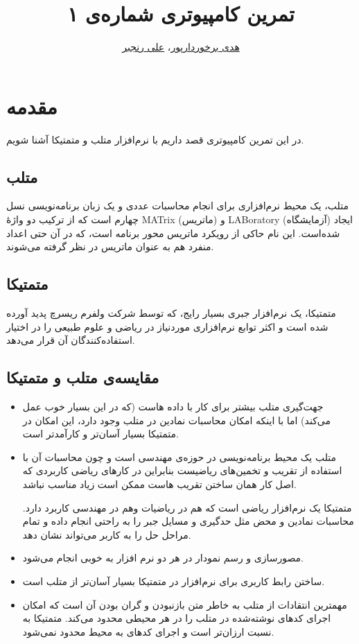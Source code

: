 \documentclass{utsignal}
\title{تمرین کامپیوتری شماره‌ی ۱}
\author{\href{mailto:hodabpour@gmail.com?subject=[SS\%20S98 A1]}{هدی برخوردارپور}، 
\href{mailto:ranjbar.ali@ut.ac.ir?subject=[SS\%20S98 A1]\%20}{علی رنجبر}}
\begin{document}
    \maketitle
    \section{مقدمه}
        در این تمرین کامپیوتری قصد داریم با نرم‌افزار ‌‌متلب  و متمتیکا آشنا شویم.
    \subsection{متلب}
 متلب، یک محیط نرم‌افزاری برای انجام محاسبات عددی و یک زبان برنامه‌نویسی نسل چهارم است که از ترکیب دو واژهٔ MATrix (ماتریس) و LABoratory (آزمایشگاه) ایجاد شده‌است.  این نام حاکی از رویکرد ماتریس محور برنامه است، که در آن حتی اعداد منفرد هم به عنوان ماتریس در نظر گرفته می‌شوند.
    \subsection{متمتیکا}
    متمتیکا، یک نرم‌افزار جبری بسیار رایج، که توسط شرکت ولفرم ریسرچ پدید آورده شده است و اکثر توابع نرم‌افزاری موردنیاز در ریاضی و علوم طبیعی را در اختیار استفاده‌کنندگان آن قرار می‌دهد.
    \subsection{مقایسه‌ی متلب و متمتیکا}
    \begin{itemize}
        \item جهت‌گیری متلب بیشتر برای کار با داده هاست (که در این بسیار خوب عمل می‌کند) اما با اینکه امکان محاسبات نمادین در‌ متلب وجود دارد، این امکان در متمتیکا بسیار آسان‌تر و کارآمدتر است. 
        \item متلب یک محیط برنامه‌نویسی در حوزه‌ی مهندسی است و چون محاسبات آن با استفاده از تقریب و تخمین‌های ریاضیست بنابراین در کارهای ریاضی کاربردی که اصل کار همان ساختن تقریب هاست ممکن است زیاد مناسب نباشد. 

    متمتیکا یک نرم‌افزار ریاضی است که هم در ریاضیات وهم در مهندسی کاربرد دارد. محاسبات نمادین و محض مثل حدگیری و مسایل جبر را به راحتی انجام داده و تمام مراحل حل را به کاربر می‌تواند نشان دهد.

    \item مصورسازی و رسم نمودار در هر دو نرم افزار به خوبی انجام می‌شود.
    
    \item ساختن رابط کاربری برای نرم‌افزار در متمتیکا بسیار آسان‌تر از متلب است.

    \item مهمترین انتقادات از متلب به خاطر متن بازنبودن و گران بودن آن است که امکان اجرای کدهای نوشته‌شده در متلب را در هر محیطی محدود می‌کند. متمتیکا به نسبت ارزان‌تر است و اجرای کدهای به محیط محدود نمی‌شود.
    
	\end{itemize}
\end{document}
